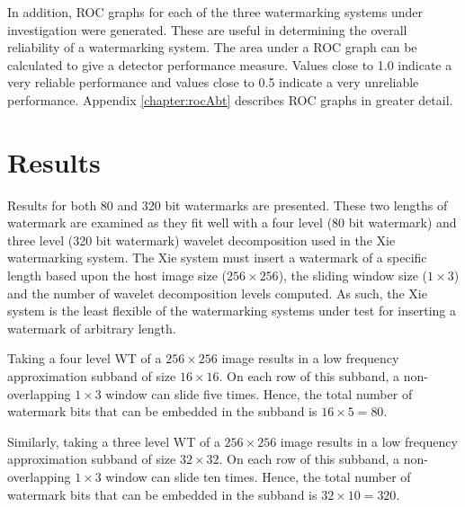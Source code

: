 \documentclass[12pt]{report}
\begin{document}
In addition, ROC graphs \cite{petit99} for each of the three watermarking systems under investigation were generated.
These are useful in determining the overall reliability of a watermarking system. The area under a ROC graph can be calculated
to give a detector performance measure. 
Values close to 1.0 indicate a very reliable performance and values close to 0.5 indicate
a very unreliable performance.
Appendix \ref{chapter:rocAbt} describes ROC graphs in greater detail.


\section{Results}
Results for both 80 and 320 bit watermarks are presented.
These two lengths of watermark are examined as they fit well with a four level (80 bit watermark) and three level (320 bit watermark) wavelet 
decomposition used in the Xie watermarking system. 
The Xie system must insert a watermark of a specific length based upon the host image size ($256 \times 256$), the
sliding window size ($1\times3$)
and the number of wavelet decomposition levels computed. As such, the Xie system is the least flexible of the
watermarking systems under test for inserting a watermark of arbitrary length.

Taking a four level WT of a $256\times 256$ image 
results in a low frequency approximation subband of size $16 \times 16$. On each row of this subband, 
a non-overlapping $1\times 3$ window can slide five times. Hence, the total number of watermark bits that can be
embedded in the subband is $16 \times 5 = 80$. 

Similarly, taking a three level WT of a $256\times 256$ image 
results in a low frequency approximation subband of size $32 \times 32$. On each row of this subband, 
a non-overlapping $1\times 3$ window can slide ten times. Hence, the total number of watermark bits that can be
embedded in the subband is $32 \times 10 = 320$.
\end{document}
